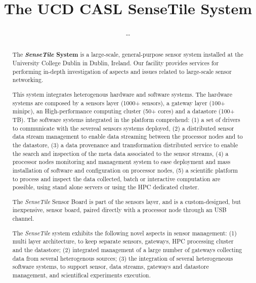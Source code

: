 \documentclass[times,10pt,twocolumn]{article}
\newcommand{\ST}{\emph{SenseTile}\xspace}
\begin{document}
\title{The UCD CASL SenseTile System}

\author{\ldots}

\maketitle

\begin{abstract}

The \textbf{\ST System} is a large-scale, general-purpose
sensor system installed at the University College Dublin in Dublin,
Ireland. 
Our facility provides services for performing in-depth
investigation of aspects and issues related to large-scale sensor 
networking.

This system integrates heterogenous hardware and software systems. 
The hardware systems are composed by a sensors layer (1000+ sensors), a gateway 
layer (100+ minipc), an High-performance computing cluster (50+ cores) and a datastore (100+ TB). 
The software systems integrated in the platform comprehend: (1) a set of
drivers to communicate with the severeal sensors systems deployed, (2)
a distributed sensor data stream management to enable data streaming between 
the processor nodes and to the datastore, (3) a data provenance and transformation
distributed service to enable the search and inspection of the meta data associated to the sensor streams, 
(4) a processor nodes monitoring and management system to ease deployment and mass 
installation of software and configuration on processor nodes, (5) a scientific platform
to process and inspect the data collected, batch or interactive computation are possible, using stand alone 
servers or using the HPC dedicated cluster.

The \ST Sensor Board is part of the sensors layer, and is a custom-designed, but inexpensive,
sensor board, paired directly with a processor node through an USB channel.

The \ST system exhibits the following novel aspects in sensor management: 
(1) multi layer architecture, to keep separate sensors, gateways, HPC processing cluster and the datastore;
(2) integrated management of a large number of gateways collecting data from several heterogenous sources;
(3) the integration of several heterogeneous software systems, to support sensor, data streams, gateways and 
datastore management, and scientifical experiments execution.

\end{abstract}
\end{document}
